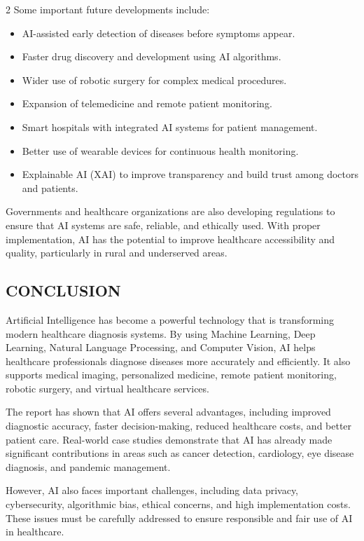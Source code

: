 \begin{multicols}{2}
\noindent
Some important future developments include:
\begin{itemize}
\item AI-assisted early detection of diseases before symptoms appear.
\item Faster drug discovery and development using AI algorithms.
\item Wider use of robotic surgery for complex medical procedures.
\item Expansion of telemedicine and remote patient monitoring.
\item Smart hospitals with integrated AI systems for patient management.
\item Better use of wearable devices for continuous health monitoring.
\item Explainable AI (XAI) to improve transparency and build trust among doctors and patients.
\end{itemize}
Governments and healthcare organizations are also developing regulations to ensure that AI systems are safe, reliable, and ethically used. With proper implementation, AI has the potential to improve healthcare accessibility and quality, particularly in rural and underserved areas.

\subsection*{\centering\uppercase{Conclusion}}
Artificial Intelligence has become a powerful technology that is transforming modern healthcare diagnosis systems. By using Machine Learning, Deep Learning, Natural Language Processing, and Computer Vision, AI helps healthcare professionals diagnose diseases more accurately and efficiently. It also supports medical imaging, personalized medicine, remote patient monitoring, robotic surgery, and virtual healthcare services.

\noindent
The report has shown that AI offers several advantages, including improved diagnostic accuracy, faster decision-making, reduced healthcare costs, and better patient care. Real-world case studies demonstrate that AI has already made significant contributions in areas such as cancer detection, cardiology, eye disease diagnosis, and pandemic management.

\noindent
However, AI also faces important challenges, including data privacy, cybersecurity, algorithmic bias, ethical concerns, and high implementation costs. These issues must be carefully addressed to ensure responsible and fair use of AI in healthcare.


\end{multicols}
